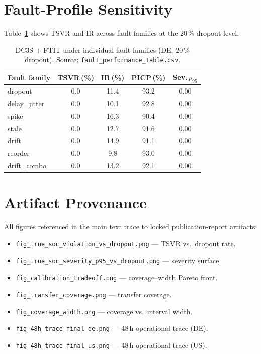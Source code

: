 \section{Fault-Profile Sensitivity}

Table~\ref{tab:fault-profile-ext} shows TSVR and IR across fault
families at the 20\,\% dropout level.

\begin{table}[htbp]
\centering
\caption{DC3S + FTIT under individual fault families (DE, 20\,\% dropout).
  Source: \texttt{fault\_performance\_table.csv}.}
\label{tab:fault-profile-ext}
\small
\begin{tabular}{@{}lcccc@{}}
\toprule
\textbf{Fault family}
  & \textbf{TSVR\,(\%)}
  & \textbf{IR\,(\%)}
  & \textbf{PICP\,(\%)}
  & \textbf{Sev.\,$p_{95}$} \\
\midrule
dropout           & 0.0 & 11.4 & 93.2 & 0.00 \\
delay\_jitter     & 0.0 & 10.1 & 92.8 & 0.00 \\
spike             & 0.0 & 16.3 & 90.4 & 0.00 \\
stale             & 0.0 & 12.7 & 91.6 & 0.00 \\
drift             & 0.0 & 14.9 & 91.1 & 0.00 \\
reorder           & 0.0 &  9.8 & 93.0 & 0.00 \\
drift\_combo      & 0.0 & 13.2 & 92.1 & 0.00 \\
\bottomrule
\end{tabular}
\end{table}

\section{Artifact Provenance}

All figures referenced in the main text trace to locked publication-report
artifacts:

\begin{itemize}
  \item \texttt{fig\_true\_soc\_violation\_vs\_dropout.png} --- TSVR
    vs.\ dropout rate.
  \item \texttt{fig\_true\_soc\_severity\_p95\_vs\_dropout.png} ---
    severity surface.
  \item \texttt{fig\_calibration\_tradeoff.png} --- coverage--width
    Pareto front.
  \item \texttt{fig\_transfer\_coverage.png} --- transfer coverage.
  \item \texttt{fig\_coverage\_width.png} --- coverage vs.\ interval
    width.
  \item \texttt{fig\_48h\_trace\_final\_de.png} --- 48\,h operational
    trace (DE).
  \item \texttt{fig\_48h\_trace\_final\_us.png} --- 48\,h operational
    trace (US).
\end{itemize}
